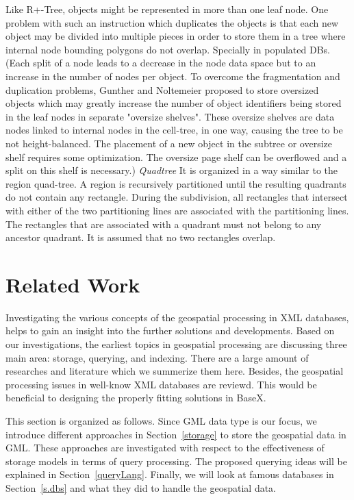 \documentclass[a4paper,12pt]{article}
\begin{document}
Like R+-Tree, objects might be represented in more than one leaf node. One problem with such an instruction which duplicates the objects is that each new object may be divided into multiple pieces in order to store them in a tree where internal node bounding polygons do not overlap. Specially in populated DBs. 
(Each split of a node leads to a decrease in the node data space but to an increase in the number of nodes per object. To overcome the fragmentation and duplication problems, Gunther and Noltemeier proposed to store oversized objects which may greatly increase the number of object identifiers being stored in the leaf nodes in separate "oversize shelves". These oversize shelves are data nodes linked to internal nodes in the cell-tree, in one way, causing the tree to be not height-balanced. The placement of a new object in the subtree or oversize shelf requires some optimization. The oversize page shelf can be overflowed and a split on this shelf is necessary.)
\emph{Quadtree}
It is organized in a way similar to the region quad-tree. A region is recursively partitioned until the resulting quadrants do not contain any rectangle. During the subdivision, all rectangles that intersect with either of the two partitioning lines are associated with the partitioning lines. The rectangles that are associated with a quadrant must not belong to any ancestor quadrant. It is assumed that no two rectangles overlap.
\newpage








\section{Related Work}
\label{s.rwork}
Investigating the various concepts of the geospatial processing in XML databases, 
helps to gain an insight into the further solutions and developments. 
Based on our investigations, the earliest topics in geospatial processing are discussing three main area: storage, querying, and indexing. There are a large amount of researches and literature which we summerize them here. Besides, the geospatial processing issues in well-know XML databases are reviewd. This would be beneficial to designing the properly fitting solutions in BaseX. 

This section is organized as follows.
Since GML data type is our focus, we introduce different approaches 
in Section~\ref{storage} to store the geospatial data in GML. 
These approaches are investigated
with respect to the effectiveness of storage models in terms of query processing. 
The proposed querying ideas will be explained in Section~\ref{queryLang}. 
Finally, we will look at
famous databases in Section~\ref{s.dbs} and what they did to handle the geospatial data.
  
\end{document}
